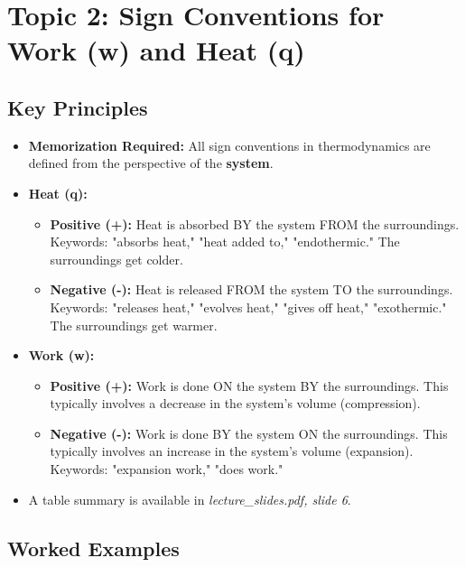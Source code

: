 \documentclass{article}
\begin{document}
\section{Topic 2: Sign Conventions for Work (w) and Heat (q)}
\subsection{Key Principles}
\begin{itemize}
    \item \textbf{Memorization Required:} All sign conventions in thermodynamics are defined from the perspective of the \textbf{system}.
    \item \textbf{Heat (q):}
        \begin{itemize}
            \item \textbf{Positive (+):} Heat is absorbed BY the system FROM the surroundings. Keywords: "absorbs heat," "heat added to," "endothermic." The surroundings get colder.
            \item \textbf{Negative (-):} Heat is released FROM the system TO the surroundings. Keywords: "releases heat," "evolves heat," "gives off heat," "exothermic." The surroundings get warmer.
        \end{itemize}
    \item \textbf{Work (w):}
        \begin{itemize}
            \item \textbf{Positive (+):} Work is done ON the system BY the surroundings. This typically involves a decrease in the system's volume (compression).
            \item \textbf{Negative (-):} Work is done BY the system ON the surroundings. This typically involves an increase in the system's volume (expansion). Keywords: "expansion work," "does work."
        \end{itemize}
    \item A table summary is available in \textit{lecture\_slides.pdf, slide 6}.
\end{itemize}

\subsection{Worked Examples}
\end{document}
